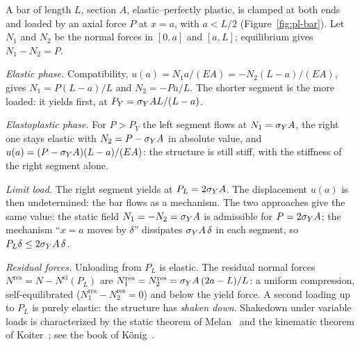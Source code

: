 \begin{example}\label{ex:pl-bar}
%
A bar of length $L$, section $A$, elastic--perfectly plastic, is clamped at
both ends and loaded by an axial force $P$ at $x=a$, with $a<L/2$
(Figure~\ref{fig:pl-bar}). Let $N_1$ and $N_2$ be the normal forces in
$[0,a]$ and $[a,L]$; equilibrium gives $N_1-N_2=P$.

\emph{Elastic phase.} Compatibility, $u(a)=N_1a/(EA)=-N_2(L-a)/(EA)$, gives
$N_1=P(L-a)/L$ and $N_2=-Pa/L$. The shorter segment is the more loaded: it
yields first, at $P_Y=\sigma_{Y} AL/(L-a)$.

\emph{Elastoplastic phase.} For $P>P_Y$ the left segment flows at
$N_1=\sigma_{Y} A$, the right one stays elastic with $N_2=P-\sigma_{Y} A$ in absolute value,
and $u(a)=(P-\sigma_{Y} A)(L-a)/(EA)$: the structure is still stiff, with the
stiffness of the right segment alone.

\emph{Limit load.} The right segment yields at $P_L=2\sigma_{Y} A$. The
displacement $u(a)$ is then undetermined: the bar flows as a mechanism. The
two approaches give the same value: the static field $N_1=-N_2=\sigma_{Y} A$ is
admissible for $P=2\sigma_{Y} A$; the mechanism ``$x=a$ moves by $\delta$'' dissipates
$\sigma_{Y} A\,\delta$ in each segment, so $P_L\delta\le2\sigma_{Y} A\,\delta$.

\emph{Residual forces.} Unloading from $P_L$ is elastic. The residual normal
forces $N^{\mathrm{res}}=N-N^{\mathrm{el}}(P_L)$ are
$N_1^{\mathrm{res}}=N_2^{\mathrm{res}}=\sigma_{Y} A\,(2a-L)/L$: a uniform compression,
self-equilibrated ($N_1^{\mathrm{res}}-N_2^{\mathrm{res}}=0$) and below the
yield force. A second loading up to $P_L$ is purely elastic: the structure
has \emph{shaken down}. Shakedown under variable loads is characterized by
the static theorem of Melan~\cite{Melan1938} and the kinematic theorem of
Koiter~\cite{Koiter1960}; see the book of K\"onig~\cite{Konig1987}.
\end{example}


